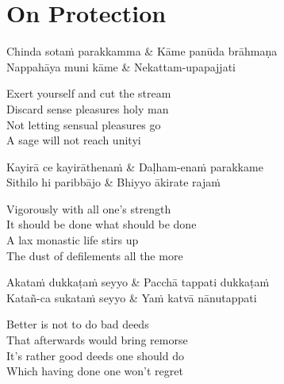 
\clearpage

\section{On Protection}

\begin{leader}
\end{leader}

\begin{twochants}
  Chinda sotaṁ parakkamma & Kāme panūda brāhmaṇa\\
  Nappahāya muni kāme & Nekattam-upapajjati\\
\end{twochants}

\begin{english}
  Exert yourself and cut the stream\\
  Discard sense pleasures holy man\\
  Not letting sensual pleasures go\\
  A sage will not reach unityi
\end{english}

\begin{twochants}
  Kayirā ce kayirāthenaṁ & Daḷham-enaṁ parakkame\\
  Sithilo hi paribbājo & Bhiyyo ākirate rajaṁ\\
\end{twochants}

\begin{english}
  Vigorously with all one’s strength\\
  It should be done what should be done\\
  A lax monastic life stirs up\\
  The dust of defilements all the more
\end{english}

\begin{twochants}
  Akataṁ dukkaṭaṁ seyyo & Pacchā tappati dukkaṭaṁ\\
  Katañ-ca sukataṁ seyyo & Yaṁ katvā nānutappati\\
\end{twochants}

\begin{english}
  Better is not to do bad deeds\\
  That afterwards would bring remorse\\
  It’s rather good deeds one should do\\
  Which having done one won’t regret
\end{english}

